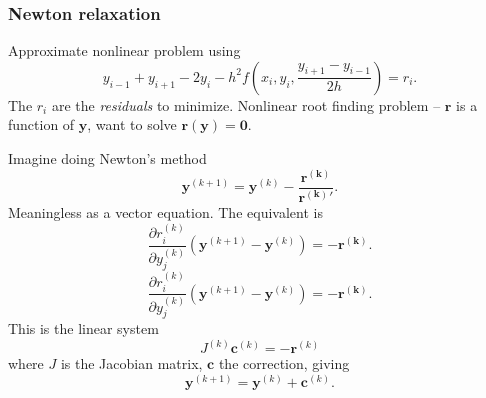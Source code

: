 \documentclass{beamer}
\newcommand{\by}{{\boldsymbol{y}}}
\newcommand{\bfm}[1]{{\boldsymbol{#1}}}
\newcommand{\pda}[2]{\frac{\partial{#1}}{\partial{#2}}}
\begin{document}
\begin{frame}
  \frametitle{Newton relaxation}

  Approximate nonlinear problem using
  \begin{equation*}
    y_{i-1} + y_{i+1} - 2 y_i - h^2 f \left( x_i, y_i, \frac{y_{i+1} -
      y_{i-1}}{2 h} \right) = r_i.
  \end{equation*}
  The $r_i$ are the \emph{residuals} to minimize. \pause Nonlinear
  root finding problem -- $\bfm{r}$ is a function of $\by$, want to
  solve $\bfm{r}(\bfm{y}) = \bfm{0}$. \pause

  \vspace{1ex}

  \begin{overlayarea}{\textwidth}{0.6\textheight}
    {
      Imagine doing Newton's method
      \begin{equation*}
        \by^{(k+1)} = \by^{(k)} - \frac{\bfm{r^{(k)}}}{\bfm{r^{(k)}}'}.
      \end{equation*}
    }
    {
      Meaningless as a vector equation. The equivalent is
      \begin{equation*}
        \pda{r_i^{(k)}}{y_j^{(k)}} \left( \by^{(k+1)} - \by^{(k)} \right) = -
        \bfm{r^{(k)}}.
      \end{equation*}
    }
    {
      \begin{equation*}
        \pda{r_i^{(k)}}{y_j^{(k)}} \left( \by^{(k+1)} - \by^{(k)} \right) = -
        \bfm{r^{(k)}}.
      \end{equation*}
      This is the linear system
      \begin{equation*}
        J^{(k)} \bfm{c}^{(k)} = - \bfm{r}^{(k)}
      \end{equation*}
      where $J$ is the Jacobian matrix, $\bfm{c}$ the correction, giving
      \begin{equation*}
        \by^{(k+1)} = \by^{(k)} + \bfm{c}^{(k)}.
      \end{equation*}
    }
  \end{overlayarea}

\end{frame}
\end{document}
